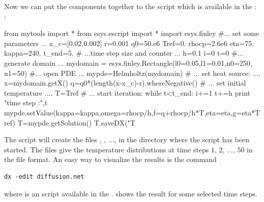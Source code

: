 Now we can put the components together to the script  which is available in the \ExampleDirectory:
:
\begin{python}
from mytools import *
from esys.escript import *
import esys.finley
#... set some parameters ...
x_c=[0.02,0.002]
r=0.001
q0=50.e6
Tref=0.
rhocp=2.6e6
eta=75.
kappa=240.
t_end=5.
# ...time step size and counter ...
h=0.1
i=0
t=0
#... generate domain ...
mydomain = esys.finley.Rectangle(l0=0.05,l1=0.01,n0=250, n1=50)
#... open PDE ...
mypde=Helmholtz(mydomain)
# ... set heat source: ....
x=mydomain.getX()
q=q0*(length(x-x_c)-r).whereNegative()
# ... set initial temperature ....
T=Tref
# ... start iteration:
while t<t_end:
      i+=1
      t+=h
      print "time step :",t
      mypde.setValue(kappa=kappa,omega=rhocp/h,f=q+rhocp/h*T,eta=eta,g=eta*Tref)
      T=mypde.getSolution()
      T.saveDX("T%
\end{python}
The script will create the files ,
 , $\ldots$,  in the directory where the script has been started. The files give the 
temperature distributions at time steps $1$, $2$, $\ldots$, $50$ in the \OpenDX file format. 
An easy way to visualize the results is the command
\begin{verbatim}
dx -edit diffusion.net
\end{verbatim}
where  is an \OpenDX script available in the \ExampleDirectory. 
 shows the result for some selected time steps.

